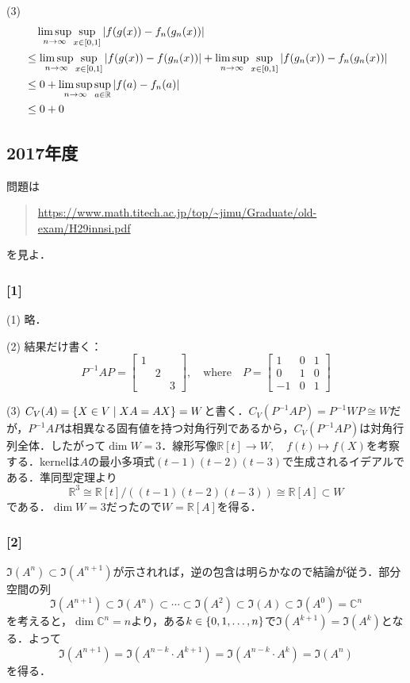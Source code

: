 \documentclass[a4j]{ltjsarticle}
\newcommand{\Rset}{\mathbb{R}}
\newcommand{\Cset}{\mathbb{C}}
\newcommand{\1}{\mathbbm{1}}
\numberwithin{equation}{section}
\theoremstyle{definition}
\begin{document}
(3) 
\begin{align}
    &\quad \limsup_{n\to\infty}\sup_{x\in[0,1]}\abs{f(g(x))-f_n(g_n(x))}\\
    &\leq \limsup_{n\to\infty}\sup_{x\in[0,1]}\abs{f(g(x))-f(g_n(x))}+\limsup_{n\to\infty}\sup_{x\in[0,1]}\abs{f(g_n(x))-f_n(g_n(x))}\\
    &\leq 0+\limsup_{n\to\infty}\sup_{a\in\Rset}\abs{f(a)-f_n(a)}\\
    &\leq 0+0
\end{align}
\subsection{2017年度}
問題は
\begin{quote}
    \url{https://www.math.titech.ac.jp/top/~jimu/Graduate/old-exam/H29innsi.pdf}
\end{quote}
を見よ．
\subsubsection*{[1]}
(1) 略．

(2) 結果だけ書く：
\begin{equation}
    P^{-1}AP=\begin{bmatrix}
        1 & & \\
         & 2 & \\
         & & 3
    \end{bmatrix},\quad \text{where}\quad P=\begin{bmatrix}
        1 & 0 & 1 \\
        0 & 1 & 0 \\
        -1 & 0 & 1 
    \end{bmatrix}
\end{equation}

(3) $C_{V}(A)=\qty{X\in V\mid XA=AX}=W$と書く．$C_{V}(P^{-1}AP)=P^{-1}WP\cong W$だが，$P^{-1}AP$は相異なる固有値を持つ対角行列であるから，$C_{V}(P^{-1}AP)$は対角行列全体．したがって$\dim W=3$．線形写像$\Rset[t]\to W,\quad f(t)\mapsto f(X)$を考察する．kernelは$A$の最小多項式$(t-1)(t-2)(t-3)$で生成されるイデアルである．準同型定理より
\begin{equation}
    \Rset^3 \cong \Rset[t]/((t-1)(t-2)(t-3))\cong \Rset[A]\subset W 
\end{equation}
である．$\dim W=3$だったので$W=\Rset[A]$を得る．
\subsubsection*{[2]}
$\Im(A^{n})\subset \Im(A^{n+1})$が示されれば，逆の包含は明らかなので結論が従う．部分空間の列
\begin{equation}
    \Im(A^{n+1})\subset \Im(A^{n})\subset \cdots\subset \Im(A^{2})\subset \Im(A)\subset \Im(A^0)=\Cset^n
\end{equation}
を考えると，$\dim \Cset^n=n$より，ある$k\in\qty{0,1,\ldots,n}$で$\Im(A^{k+1})=\Im(A^k)$となる．よって
\begin{equation}
    \Im(A^{n+1})=\Im(A^{n-k}\cdot A^{k+1})=\Im(A^{n-k}\cdot A^{k})=\Im(A^n)
\end{equation}
を得る．
\end{document}
